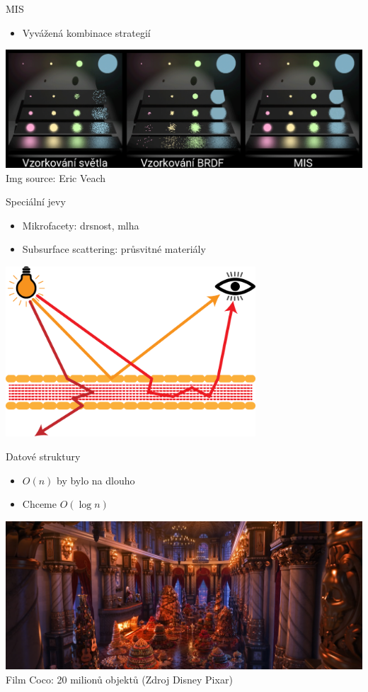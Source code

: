 \documentclass[czech]{beamer}
\begin{document}
\begin{frame}{MIS}
\begin{itemize}
  \item Vyvážená kombinace strategií
\end{itemize}
\vfill
\centering \includegraphics[width=1\textwidth]{img/mis - full.png}\\
{\footnotesize \hfill Img source: Eric Veach}
\end{frame}



\begin{frame}{Speciální jevy}
\begin{itemize}
  \item Mikrofacety: drsnost, mlha
  \item Subsurface scattering: průsvitné materiály
\end{itemize}
\vfill
\centering \includegraphics[width=0.7\textwidth]{img/subsurface scatering.png}
\end{frame}


\begin{frame}{Datové struktury}
\begin{itemize}
  \item $O(n)$ by bylo na dlouho
  \item Chceme $O(\log{n})$ 
\end{itemize}
\centering \includegraphics[width=1\textwidth]{img/coco.png}
{\footnotesize \hfill Film Coco: 20 milionů objektů (Zdroj Disney Pixar)}
\end{frame}
\end{document}

